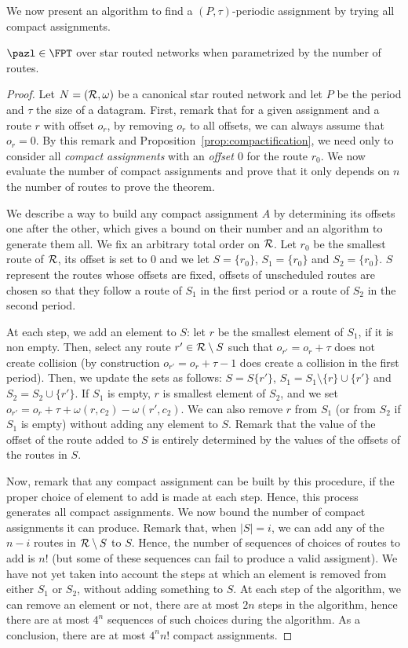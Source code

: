 We now present an algorithm to find a $(P,\tau)$-periodic assignment by trying all compact assignments.

\begin{theorem}\label{th:FPT}
$\pazl \in \FPT$ over star routed networks when parametrized by the number of routes.
\end{theorem}
\begin{proof}
Let $N = ({\cal R},\omega)$ be a canonical star routed network and let $P$ be the period and $\tau$ the size of a datagram. First, remark that for a given assignment and a route $r$ with offset $o_r$, by removing $o_r$ to all offsets, we can always assume that $o_r = 0$. By this remark and Proposition~\ref{prop:compactification}, we need only to consider all \emph{compact assignments} with an \emph{offset $0$} for the route $r_0$. We now evaluate the number of compact assignments and prove that it only depends on $n$ the number of routes to prove the theorem.

 We describe a way to build any compact assignment $A$ by determining its offsets one after the other, which gives a bound on their number and an algorithm to generate them all. We fix an arbitrary total order on ${\cal R}$. Let $r_0$ be the smallest route of $\cal{R}$, its offset is set to $0$ and we let $S = \{r_0\}$,
 $S_1 = \{r_0\}$ and $S_2 = \{r_0\}$. $S$ represent the routes whose offsets are fixed, 
 offsets of unscheduled routes are chosen so that they follow a route of $S_1$ in the first period or a route of $S_2$ in the second period.

 At each step, we add an element to $S$: let $r$ be the smallest element of $S_1$, if it is non empty. Then, select any route $r' \in {\cal R} \setminus S$ 
 such that $o_{r'} = o_{r} + \tau$ does not create collision (by construction $o_{r'} = o_{r} + \tau - 1$ does create a collision in the first period). Then, we update the sets as follows:
 $S = S \{r'\}$, $S_1 = S_1 \setminus \{r\} \cup \{r'\}$ and $S_2 = S_2 \cup \{r'\}$. If 
 $S_1$ is empty, $r$ is smallest element of $S_2$, and we set $o_{r'} = o_{r} + \tau + \omega(r,c_2) - \omega(r',c_2)$.
 We can also remove $r$ from $S_1$ (or from $S_2$ if $S_1$ is empty) without adding any element to $S$. Remark that the value of the offset of the route added to $S$ is entirely determined by the values of the offsets of the routes in $S$.

 Now, remark that any compact assignment can be built by this procedure, if the proper choice of element to add is made at each step. Hence, this process generates all compact assignments. We now bound the number of compact assignments it can produce. Remark that, when $|S| = i$, we can add any of the $n-i$ routes in ${\cal R} \setminus S$ to $S$. Hence, the number of sequences of choices of routes to add is $n!$ (but some of these sequences can fail to produce a valid assigment). We have not yet taken into account the steps at which an element is removed from either $S_1$ or $S_2$, without adding something to $S$. At each step of the algorithm, we can remove an element or not, there are at most $2n$ steps in the algorithm, hence there are at most $4^n$ sequences of such choices during the algorithm. As a conclusion, there are at most $4^nn!$ compact assignments.


\end{proof}

